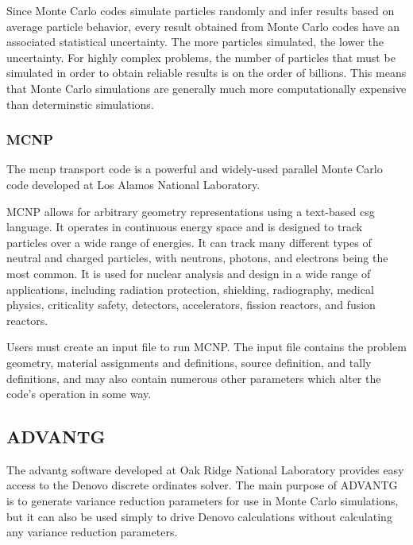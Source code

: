 Since Monte Carlo codes simulate particles randomly and infer results based on average particle behavior, every result obtained from Monte Carlo codes have an associated statistical uncertainty.
The more particles simulated, the lower the uncertainty.
For highly complex problems, the number of particles that must be simulated in order to obtain reliable results is on the order of billions.
This means that Monte Carlo simulations are generally much more computationally expensive than determinstic simulations.

\subsubsection{MCNP}
\label{sec:bg:rt:mc:mcnp}

The \ac{mcnp} transport code \cite{mcnp620} is a powerful and widely-used parallel Monte Carlo code developed at Los Alamos National Laboratory.

MCNP allows for arbitrary geometry representations using a text-based \ac{csg} language.
It operates in continuous energy space and is designed to track particles over a wide range of energies.
It can track many different types of neutral and charged particles, with neutrons, photons, and electrons being the most common.
It is used for nuclear analysis and design in a wide range of applications, including radiation protection, shielding, radiography, medical physics, criticality safety, detectors, accelerators, fission reactors, and fusion reactors.

Users must create an input file to run MCNP.
The input file contains the problem geometry, material assignments and definitions, source definition, and tally definitions, and may also contain numerous other parameters which alter the code's operation in some way.

\subsection{ADVANTG}
\label{sec:bg:rt:advantg}

The \ac{advantg} \cite{advantg} software developed at Oak Ridge National Laboratory provides easy access to the Denovo discrete ordinates solver.
The main purpose of ADVANTG is to generate variance reduction parameters for use in Monte Carlo simulations, but it can also be used simply to drive Denovo calculations without calculating any variance reduction parameters.

